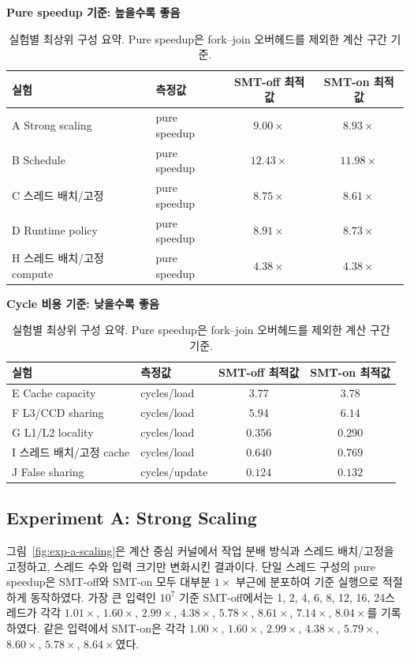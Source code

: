 \documentclass[11pt,a4paper]{article}
\begin{document}
\begin{table}[h]
\centering
\small
\textbf{Pure speedup 기준: 높을수록 좋음}\par\medskip
\begin{tabular}{llcc}
\toprule
실험 & 측정값 & SMT-off 최적값 & SMT-on 최적값 \\
\midrule
A Strong scaling & pure speedup & $9.00\times$ & $8.93\times$ \\
B Schedule & pure speedup & $12.43\times$ & $11.98\times$ \\
C 스레드 배치/고정 & pure speedup & $8.75\times$ & $8.61\times$ \\
D Runtime policy & pure speedup & $8.91\times$ & $8.73\times$ \\
H 스레드 배치/고정 compute & pure speedup & $4.38\times$ & $4.38\times$ \\
\bottomrule
\end{tabular}

\vspace{0.8em}
\textbf{Cycle 비용 기준: 낮을수록 좋음}\par\medskip
\begin{tabular}{llcc}
\toprule
실험 & 측정값 & SMT-off 최적값 & SMT-on 최적값 \\
\midrule
E Cache capacity & cycles/load & $3.77$ & $3.78$ \\
F L3/CCD sharing & cycles/load & $5.94$ & $6.14$ \\
G L1/L2 locality & cycles/load & $0.356$ & $0.290$ \\
I 스레드 배치/고정 cache & cycles/load & $0.640$ & $0.769$ \\
J False sharing & cycles/update & $0.124$ & $0.132$ \\
\bottomrule
\end{tabular}
\caption{실험별 최상위 구성 요약. Pure speedup은 fork--join 오버헤드를 제외한 계산 구간 기준.}
\label{tab:result-summary}
\end{table}

\subsection{Experiment A: Strong Scaling}

그림~\ref{fig:exp-a-scaling}은 계산 중심 커널에서 작업 분배 방식과 스레드 배치/고정을 고정하고, 스레드 수와 입력 크기만 변화시킨 결과이다. 단일 스레드 구성의 pure speedup은 SMT-off와 SMT-on 모두 대부분 $1\times$ 부근에 분포하여 기준 실행으로 적절하게 동작하였다. 가장 큰 입력인 $10^7$ 기준 SMT-off에서는 1, 2, 4, 6, 8, 12, 16, 24스레드가 각각 $1.01\times$, $1.60\times$, $2.99\times$, $4.38\times$, $5.78\times$, $8.61\times$, $7.14\times$, $8.04\times$를 기록하였다. 같은 입력에서 SMT-on은 각각 $1.00\times$, $1.60\times$, $2.99\times$, $4.38\times$, $5.79\times$, $8.60\times$, $5.78\times$, $8.64\times$였다.
\end{document}
